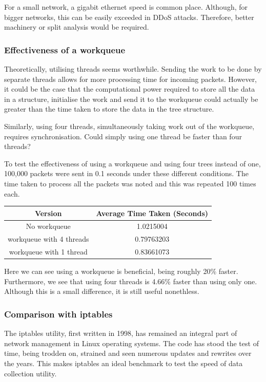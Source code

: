 \documentclass[12pt,twoside]{article}
\begin{document}
For a small network, a gigabit ethernet speed is common place. Although, for bigger networks, this can be easily exceeded in DDoS attacks. Therefore, better machinery  or split analysis would be required. 

\subsubsection{Effectiveness of a workqueue}
Theoretically, utilising threads seems worthwhile. Sending the work to be done by separate threads allows for more processing time for incoming packets. However, it could be the case that the computational power required to store all the data in a structure, initialise the work and send it to the workqueue could actually be greater than the time taken to store the data in the tree structure. 

Similarly, using four threads, simultaneously taking work out of the workqueue, requires synchronisation. Could simply using one thread be faster than four threads?

To test the effectiveness of using a workqueue and using four trees instead of one, 100,000 packets were sent in 0.1 seconds under these different conditions. The time taken to process all the packets was noted and this was repeated 100 times each.

\begin{center}
	\begin{tabular}{|c | c|} 
		\hline
		Version & Average Time Taken (Seconds)\\ [0.5ex] 
		\hline\hline
		No workqueue & 1.0215004\\
		\hline
		workqueue with 4 threads & 0.79763203 \\
		\hline
		workqueue with 1 thread & 0.83661073 \\ [1ex] 
		\hline
	\end{tabular}
\end{center}

Here we can see using a workqueue is beneficial, being roughly 20\% faster. Furthermore, we see that using four threads is 4.66\% faster than using only one. Although this is a small difference, it is still useful nonethless.

\subsubsection{Comparison with iptables}
The iptables utility, first written in 1998, has remained an integral part of network management in Linux operating systems. The code has stood the test of time, being trodden on, strained and seen numerous updates and rewrites over the years. This makes iptables an ideal benchmark to test the speed of data collection utility.
\end{document}

